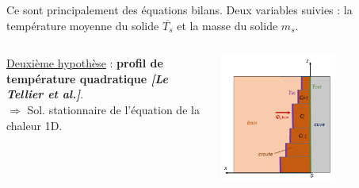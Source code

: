 \documentclass{beamer}
\newcommand{\bib}[1]{{\color{cea_texte!80}\tiny\textit{[#1]}}}
\begin{document}
\begin{frame}
\color{cea_texte!70}	Ce sont principalement des équations bilans. Deux variables suivies : la température moyenne du solide $\overline{T_s}$ et la masse du solide $m_s$.\color{cea_texte}
\begin{columns}[c]
	\begin{column}{0.55\textwidth}
	\underline{Deuxième hypothèse} : \textbf{profil de température quadratique \bib{Le Tellier et al.}}.\\
	\color{cea_texte!70} $\Rightarrow$ Sol. stationnaire de l'équation de la chaleur 1D. \color{cea_texte}
	\vspace{0.5cm}
	\fbox{\begin{minipage}[]{\textwidth}
	\center\textcolor{red}{On va lever ces deux hypothèses.}
	\end{minipage}}
	\end{column}
    \begin{column}{0.45\textwidth}
	\begin{center} 
	\includegraphics[width=0.62\textwidth]{Figures/modele_croute_0D.png}
			
		\end{center}
		\end{column}
\end{columns}
\end{frame}
\end{document}
